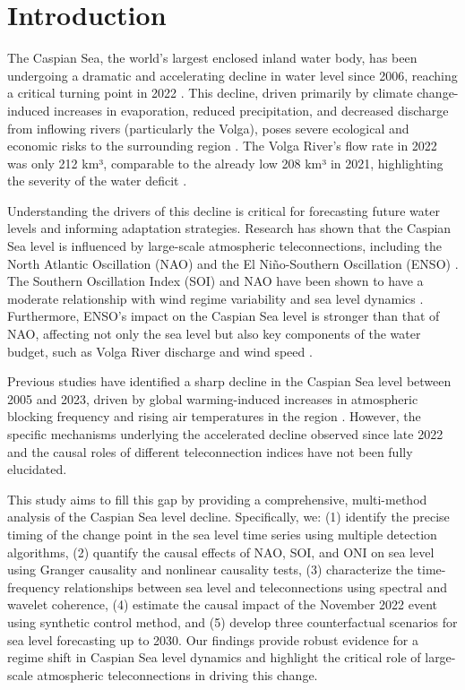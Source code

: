 \documentclass[12pt,a4paper,twocolumn]{article}
\begin{document}
\section{Introduction}

The Caspian Sea, the world's largest enclosed inland water body, has been undergoing a dramatic and accelerating decline in water level since 2006, reaching a critical turning point in 2022 \citep{channelnewsasia2024, cabar2024}. This decline, driven primarily by climate change-induced increases in evaporation, reduced precipitation, and decreased discharge from inflowing rivers (particularly the Volga), poses severe ecological and economic risks to the surrounding region \citep{core2025, springer2025}. The Volga River's flow rate in 2022 was only 212 km³, comparable to the already low 208 km³ in 2021, highlighting the severity of the water deficit \citep{cabar2023}.

Understanding the drivers of this decline is critical for forecasting future water levels and informing adaptation strategies. Research has shown that the Caspian Sea level is influenced by large-scale atmospheric teleconnections, including the North Atlantic Oscillation (NAO) and the El Niño-Southern Oscillation (ENSO) \citep{nature2025, openpolar2025}. The Southern Oscillation Index (SOI) and NAO have been shown to have a moderate relationship with wind regime variability and sea level dynamics \citep{nature2025}. Furthermore, ENSO's impact on the Caspian Sea level is stronger than that of NAO, affecting not only the sea level but also key components of the water budget, such as Volga River discharge and wind speed \citep{openpolar2025}.

Previous studies have identified a sharp decline in the Caspian Sea level between 2005 and 2023, driven by global warming-induced increases in atmospheric blocking frequency and rising air temperatures in the region \citep{springer2025}. However, the specific mechanisms underlying the accelerated decline observed since late 2022 and the causal roles of different teleconnection indices have not been fully elucidated.

This study aims to fill this gap by providing a comprehensive, multi-method analysis of the Caspian Sea level decline. Specifically, we: (1) identify the precise timing of the change point in the sea level time series using multiple detection algorithms, (2) quantify the causal effects of NAO, SOI, and ONI on sea level using Granger causality and nonlinear causality tests, (3) characterize the time-frequency relationships between sea level and teleconnections using spectral and wavelet coherence, (4) estimate the causal impact of the November 2022 event using synthetic control method, and (5) develop three counterfactual scenarios for sea level forecasting up to 2030. Our findings provide robust evidence for a regime shift in Caspian Sea level dynamics and highlight the critical role of large-scale atmospheric teleconnections in driving this change.
\end{document}
